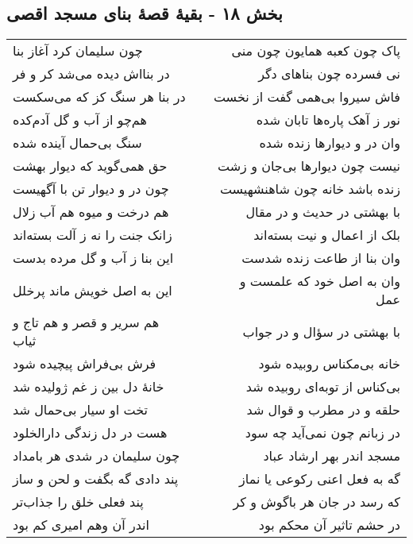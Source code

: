 \begin{center}
\section*{بخش ۱۸ - بقیهٔ قصهٔ بنای مسجد اقصی}
\label{sec:sh018}
\begin{longtable}{l p{0.5cm} r}
چون سلیمان کرد آغاز بنا
&&
پاک چون کعبه همایون چون منی
\\
در بنااش دیده می‌شد کر و فر
&&
نی فسرده چون بناهای دگر
\\
در بنا هر سنگ کز که می‌سکست
&&
فاش سیروا بی‌همی گفت از نخست
\\
هم‌چو از آب و گل آدم‌کده
&&
نور ز آهک پاره‌ها تابان شده
\\
سنگ بی‌حمال آینده شده
&&
وان در و دیوارها زنده شده
\\
حق همی‌گوید که دیوار بهشت
&&
نیست چون دیوارها بی‌جان و زشت
\\
چون در و دیوار تن با آگهیست
&&
زنده باشد خانه چون شاهنشهیست
\\
هم درخت و میوه هم آب زلال
&&
با بهشتی در حدیث و در مقال
\\
زانک جنت را نه ز آلت بسته‌اند
&&
بلک از اعمال و نیت بسته‌اند
\\
این بنا ز آب و گل مرده بدست
&&
وان بنا از طاعت زنده شدست
\\
این به اصل خویش ماند پرخلل
&&
وان به اصل خود که علمست و عمل
\\
هم سریر و قصر و هم تاج و ثیاب
&&
با بهشتی در سؤال و در جواب
\\
فرش بی‌فراش پیچیده شود
&&
خانه بی‌مکناس روبیده شود
\\
خانهٔ دل بین ز غم ژولیده شد
&&
بی‌کناس از توبه‌ای روبیده شد
\\
تخت او سیار بی‌حمال شد
&&
حلقه و در مطرب و قوال شد
\\
هست در دل زندگی دارالخلود
&&
در زبانم چون نمی‌آید چه سود
\\
چون سلیمان در شدی هر بامداد
&&
مسجد اندر بهر ارشاد عباد
\\
پند دادی گه بگفت و لحن و ساز
&&
گه به فعل اعنی رکوعی یا نماز
\\
پند فعلی خلق را جذاب‌تر
&&
که رسد در جان هر باگوش و کر
\\
اندر آن وهم امیری کم بود
&&
در حشم تاثیر آن محکم بود
\\
\end{longtable}
\end{center}
